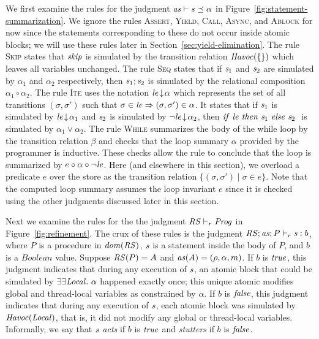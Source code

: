 We first examine the rules for the judgment $\mathit{as} \vdash \mathit{s} \preceq \alpha$ in Figure~\ref{fig:statement-summarization}.
We ignore the rules \textsc{Assert}, \textsc{Yield}, \textsc{Call}, \textsc{Async}, and \textsc{Ablock} for now since the 
statements corresponding to these do not occur inside atomic blocks; we will use these rules later in Section~\ref{sec:yield-elimination}.
The rule \textsc{Skip} states that $\mathit{skip}$ is simulated by the transition relation $\mathit{Havoc}(\{\})$ which leaves all variables unchanged.
The rule \textsc{Seq} states that if $\mathit{s}_1$ and $\mathit{s}_2$ are simulated by $\alpha_1$ and $\alpha_2$ respectively, 
then $\mathit{s}_1;\mathit{s}_2$ is simulated by the relational composition $\alpha_1 \circ \alpha_2$.
The rule \textsc{Ite} uses the notation ${\mathit{le}}\!\downarrow\!{\alpha}$ which represents the set of all transitions $(\sigma, \sigma')$ 
such that $\sigma \in \mathit{le} \Rightarrow (\sigma,\sigma') \in \alpha$.
It states that if $\mathit{s}_1$ is simulated by ${\mathit{le}}\!\downarrow\!{\alpha_1}$ and $\mathit{s}_2$ is simulated by ${\neg \mathit{le}}\!\downarrow\!{\alpha_2}$,
then ${\mathit{if}\ {\mathit{le}}\ }{\mathit{then}\ {\mathit{s}_1}\ }{\mathit{else}\ {\mathit{s}_2}\ }$ is simulated by $\alpha_1 \vee \alpha_2$.
The rule \textsc{While} summarizes the body of the while loop by the transition relation $\beta$ and checks that the 
loop summary $\alpha$ provided by the programmer is inductive.
These checks allow the rule to conclude that the loop is summarized by $e \circ \alpha \circ \neg \mathit{le}$.
Here (and elsewhere in this section), we overload a predicate $e$ over the store as the transition relation $\{(\sigma,\sigma') \mid \sigma \in e\}$.
Note that the computed loop summary assumes the loop invariant $e$ since it is checked using the other judgments discussed later in this section.

Next we examine the rules for the the judgment $\mathit{RS} \vdash_r \mathit{Prog}$ in Figure~\ref{fig:refinement}.
The crux of these rules is the judgment $\mathit{RS};\mathit{as};P \vdash_r \mathit{s} : b$, 
where $P$ is a procedure in $\mathit{dom}(\mathit{RS})$, $\mathit{s}$ is a statement inside the body of $P$, and $b$ is a 
$\mathit{Boolean}$ value.
Suppose $\mathit{RS}(P) = A$ and $\mathit{as}(A) = (\rho, \alpha, m)$.
If $b$ is $\mathit{true}$, this judgment indicates that during any execution of $\mathit{s}$, 
an atomic block that could be simulated by $\exists\exists {\mathit{Local}}.\ \alpha$ happened exactly once;
this unique atomic modifies global and thread-local variables as constrained by $\alpha$.
If $b$ is $\mathit{false}$, this judgment indicates that during any execution of $\mathit{s}$, each atomic block
was simulated by $\mathit{Havoc}(\mathit{Local})$, that is, it did not modify any global or thread-local variables.
Informally, we say that $\mathit{s}$ {\em acts\/} if $b$ is $\mathit{true}$ and {\em stutters\/} if $b$ is $\mathit{false}$.

